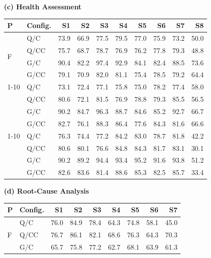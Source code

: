 \begin{table}[t]
\begin{minipage}[t]{0.49\textwidth}
\centering
\textbf{(c) Health Assessment}\par\vspace{3pt}
\begin{tabular*}{\linewidth}{@{\extracolsep{\fill}}ll*{8}{r}@{}}
\toprule
P & Config. & S1 & S2 & S3 & S4 & S5 & S6 & S7 & S8 \\
\midrule
\multirow{4}{*}{F} & Q/C & 73.9 & 66.9 & 77.5 & 79.5 & 77.0 & 75.9 & 73.2 & 50.0 \\
 & Q/CC & 75.7 & 68.7 & 78.7 & 76.9 & 76.2 & 77.8 & 79.3 & 48.8 \\
 & G/C & 90.4 & 82.2 & 97.4 & 92.9 & 84.1 & 82.4 & 88.5 & 73.6 \\
 & G/CC & 79.1 & 70.9 & 82.0 & 81.1 & 75.4 & 78.5 & 79.2 & 64.4 \\
\cmidrule(lr){1-10}
\multirow{4}{*}{N} & Q/C & 73.1 & 72.4 & 77.1 & 75.8 & 75.0 & 78.2 & 77.4 & 58.0 \\
 & Q/CC & 80.6 & 72.1 & 81.5 & 76.9 & 78.8 & 79.3 & 85.5 & 56.5 \\
 & G/C & 90.2 & 84.7 & 96.3 & 88.7 & 84.6 & 85.2 & 92.7 & 66.7 \\
 & G/CC & 82.7 & 76.1 & 88.3 & 86.4 & 77.6 & 84.3 & 81.6 & 66.6 \\
\cmidrule(lr){1-10}
\multirow{4}{*}{S} & Q/C & 76.3 & 74.4 & 77.2 & 84.2 & 83.0 & 78.7 & 81.8 & 42.2 \\
 & Q/CC & 80.6 & 80.1 & 76.6 & 84.8 & 84.3 & 81.7 & 83.1 & 30.1 \\
 & G/C & 90.2 & 89.2 & 94.4 & 93.4 & 95.2 & 91.6 & 93.8 & 51.2 \\
 & G/CC & 82.6 & 83.6 & 81.4 & 88.6 & 85.3 & 82.5 & 85.7 & 33.4 \\
\bottomrule
\end{tabular*}
\end{minipage}\hfill
\begin{minipage}[t]{0.49\textwidth}
\centering
\textbf{(d) Root-Cause Analysis}\par\vspace{3pt}
\begin{tabular*}{\linewidth}{@{\extracolsep{\fill}}ll*{7}{r}@{}}
\toprule
P & Config. & S1 & S2 & S3 & S4 & S5 & S6 & S7 \\
\midrule
\multirow{4}{*}{F} & Q/C & 76.0 & 84.9 & 78.4 & 64.3 & 74.8 & 58.1 & 45.0 \\
 & Q/CC & 76.7 & 86.1 & 82.1 & 68.6 & 76.3 & 64.3 & 70.3 \\
 & G/C & 65.7 & 75.8 & 77.2 & 62.7 & 68.1 & 63.9 & 61.3 \\

\end{tabular*}
\end{minipage}
\end{table}

